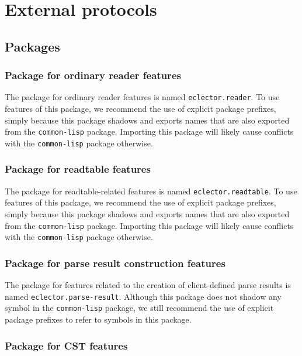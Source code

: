 \chapter{External protocols}

\section{Packages}

\subsection{Package for ordinary reader features}
\label{sec:package-ordinary-reader-features}

The package for ordinary reader features is named
\texttt{eclector.reader}.  To use features of this package, we
recommend the use of explicit package prefixes, simply because this
package shadows and exports names that are also exported from the
\texttt{common-lisp} package.  Importing this package will likely
cause conflicts with the \texttt{common-lisp} package otherwise.

\subsection{Package for readtable features}
\label{sec:package-readtable-features}

The package for readtable-related features is named
\texttt{eclector.readtable}.  To use features of this package, we
recommend the use of explicit package prefixes, simply because this
package shadows and exports names that are also exported from the
\texttt{common-lisp} package.  Importing this package will likely
cause conflicts with the \texttt{common-lisp} package otherwise.

\subsection{Package for parse result construction features}
\label{sec:package-parse-result}

The package for features related to the creation of client-defined
parse results is named \texttt{eclector.parse-result}.  Although this
package does not shadow any symbol in the \texttt{common-lisp}
package, we still recommend the use of explicit package prefixes to
refer to symbols in this package.

\subsection{Package for CST features}
\label{sec:package-cst-features}

